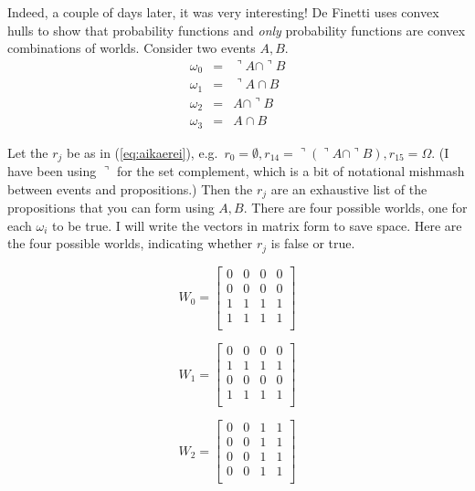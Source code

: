 \documentclass[12pt]{article}
\begin{document}
Indeed, a couple of days later, it was very interesting! De Finetti
uses convex hulls to show that probability functions and \emph{only}
probability functions are convex combinations of worlds. Consider
two events $A,B$. 
\begin{equation}
  \label{eq:ongeefoo}
  \begin{array}{rcl}
  \omega_{0}&=&\urcorner{}A\cap\urcorner{}B \\
  \omega_{1}&=&\urcorner{}A\cap{}B \\
  \omega_{2}&=&A\cap\urcorner{}B \\
  \omega_{3}&=&A\cap{}B
  \end{array}
\end{equation}

Let the $r_{j}$ be as in (\ref{eq:aikaerei}), e.g.\
$r_{0}=\emptyset,r_{14}=\urcorner(\urcorner{}A\cap\urcorner{}B),r_{15}=\Omega$.
(I have been using $\urcorner$ for the set complement, which is a bit
of notational mishmash between events and propositions.) Then the
$r_{j}$ are an exhaustive list of the propositions that you can form
using $A,B$. There are four possible worlds, one for each $\omega_{i}$
to be true. I will write the vectors in matrix form to save space.
Here are the four possible worlds, indicating whether $r_{j}$ is false
or true. 

\begin{equation}
  \label{eq:aicooroh}
  W_{0}=\left[
    \begin{array}{cccc}
      0 & 0 & 0 & 0 \\
      0 & 0 & 0 & 0 \\
      1 & 1 & 1 & 1 \\
      1 & 1 & 1 & 1 \\
    \end{array}\right]
\end{equation}

\begin{equation}
  \label{eq:johruave}
  W_{1}=\left[
    \begin{array}{cccc}
      0 & 0 & 0 & 0 \\
      1 & 1 & 1 & 1 \\
      0 & 0 & 0 & 0 \\
      1 & 1 & 1 & 1 \\
    \end{array}\right]
\end{equation}

\begin{equation}
  \label{eq:eivohcoy}
  W_{2}=\left[
    \begin{array}{cccc}
      0 & 0 & 1 & 1 \\
      0 & 0 & 1 & 1 \\
      0 & 0 & 1 & 1 \\
      0 & 0 & 1 & 1 \\
    \end{array}\right]
\end{equation}
\end{document}
